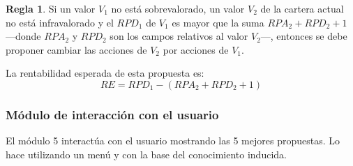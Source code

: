 \documentclass[a4paper, 11pt, titlepage]{article}
\theoremstyle{definition}
\newtheorem{regla}{Regla}
\begin{document}
    \begin{regla}
        Si un valor $V_1$ no está sobrevalorado, un valor $V_2$ de la cartera actual no está infravalorado y el $RPD_1$ de $V_1$ es mayor que la suma $RPA_2 + RPD_2 + 1$ ---donde $RPA_2$ y $RPD_2$ son los campos relativos al valor $V_2$---, entonces se debe proponer cambiar las acciones de $V_2$ por acciones de $V_1$.

        La rentabilidad esperada de esta propuesta es:
        \[
        RE = RPD_1 - (RPA_2 + RPD_2 + 1)
        \]
    \end{regla}

  \subsubsection{Módulo de interacción con el usuario}

  El módulo 5 interactúa con el usuario mostrando las 5 mejores propuestas.
  Lo hace utilizando un menú y con la base del conocimiento inducida.
\end{document}
